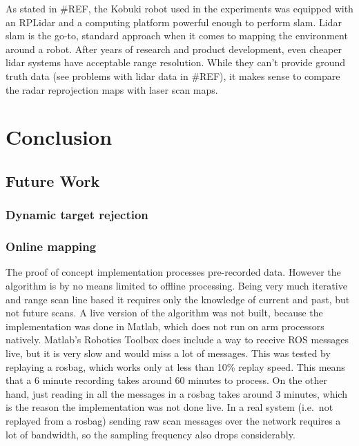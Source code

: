 As stated in \#REF, the Kobuki robot used in the experiments was
equipped with an RPLidar and a computing platform powerful enough to
perform slam. Lidar slam is the go-to, standard approach when it comes
to mapping the environment around a robot. After years of research and
product development, even cheaper lidar systems have acceptable range
resolution. While they can't provide ground truth data (see problems
with lidar data in \#REF), it makes sense to compare the radar
reprojection maps with laser scan maps.

\section{Conclusion}\label{conclusion}

\subsection{Future Work}\label{future-work}

\subsubsection{Dynamic target rejection}\label{dynamic-target-rejection}

\subsubsection{Online mapping}\label{online-mapping}

The proof of concept implementation processes pre-recorded data. However
the algorithm is by no means limited to offline processing. Being very
much iterative and range scan line based it requires only the knowledge
of current and past, but not future scans. A live version of the
algorithm was not built, because the implementation was done in Matlab,
which does not run on arm processors natively. Matlab's Robotics Toolbox
does include a way to receive ROS messages live, but it is very slow and
would miss a lot of messages. This was tested by replaying a rosbag,
which works only at less than 10\% replay speed. This means that a 6
minute recording takes around 60 minutes to process. On the other hand,
just reading in all the messages in a rosbag takes around 3 minutes,
which is the reason the implementation was not done live. In a real
system (i.e.~not replayed from a rosbag) sending raw scan messages over
the network requires a lot of bandwidth, so the sampling frequency also
drops considerably.

